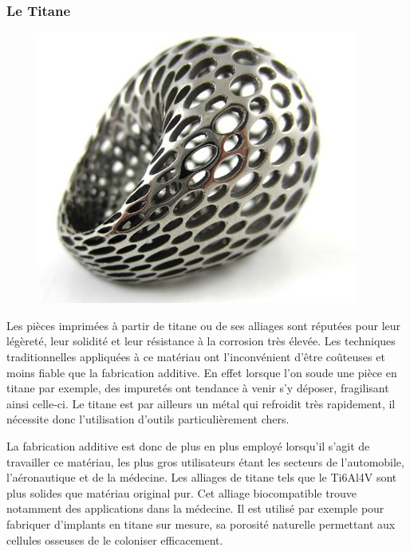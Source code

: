 \documentclass{article}
\begin{document}
\subsubsection{Le Titane}
\begin{figure}[h!]
\centering
\includegraphics[scale=0.4]{./images/titane.png}
\end{figure}\hfill
 \par\leavevmode\par
Les pièces imprimées à partir de titane ou de ses alliages sont réputées pour leur légèreté, leur solidité et leur résistance à la corrosion très élevée. Les techniques traditionnelles appliquées à ce matériau ont l'inconvénient d'être coûteuses et moins fiable que la fabrication additive. En effet lorsque l'on soude une pièce en titane par exemple, des impuretés ont tendance à venir s'y déposer, fragilisant ainsi celle-ci. Le titane est par ailleurs un métal qui refroidit très rapidement, il nécessite donc l'utilisation d'outils particulièrement chers.\hfill
 \par\leavevmode\par
La fabrication additive est donc de plus en plus employé lorsqu'il s'agit de travailler ce matériau, les plus gros utilisateurs étant les secteurs de l'automobile, l'aéronautique et de la médecine. Les alliages de titane tels que le Ti6Al4V sont plus solides que matériau original pur. Cet alliage biocompatible trouve notamment des applications dans la médecine. Il est utilisé par exemple pour fabriquer d'implants en titane sur mesure, sa porosité naturelle permettant aux cellules osseuses de le coloniser efficacement.\hfill
 \par\leavevmode\par
{}
\newpage
\end{document}
